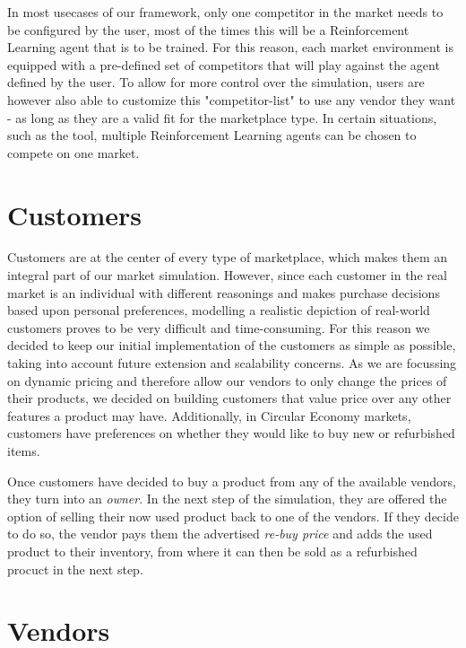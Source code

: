 In most usecases of our framework, only one competitor in the market needs to be configured by the user, most of the times this will be a Reinforcement Learning agent that is to be trained. For this reason, each market environment is equipped with a pre-defined set of competitors that will play against the agent defined by the user. To allow for more control over the simulation, users are however also able to customize this "competitor-list" to use any vendor they want - as long as they are a valid fit for the marketplace type. In certain situations, such as the  tool, multiple Reinforcement Learning agents can be chosen to compete on one market.

\section{Customers}

Customers are at the center of every type of marketplace, which makes them an integral part of our market simulation. However, since each customer in the real market is an individual with different reasonings and makes purchase decisions based upon personal preferences, modelling a realistic depiction of real-world customers proves to be very difficult and time-consuming. For this reason we decided to keep our initial implementation of the customers as simple as possible, taking into account future extension and scalability concerns. As we are focussing on dynamic pricing and therefore allow our vendors to only change the prices of their products, we decided on building customers that value price over any other features a product may have. Additionally, in Circular Economy markets, customers have preferences on whether they would like to buy new or refurbished items.

Once customers have decided to buy a product from any of the available vendors, they turn into an \emph{owner}. In the next step of the simulation, they are offered the option of selling their now used product back to one of the vendors. If they decide to do so, the vendor pays them the advertised \emph{re-buy price} and adds the used product to their inventory, from where it can then be sold as a refurbished procuct in the next step.

\section{Vendors} \label{sec:ExplainVendors}

